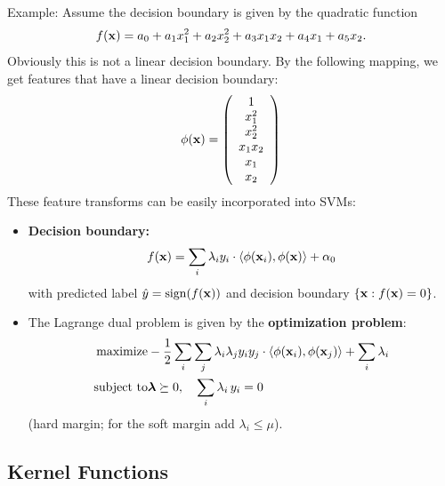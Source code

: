     Example: Assume the decision boundary is given by the quadratic function
    \begin{displaymath}
      f(\bm{\mathrm{x}}) = a_0 + a_1 x_1^2 + a_2 x_2^2 + a_3 x_1 x_2 + a_4 x_1+a_5 x_2.
    \end{displaymath}
    Obviously this is not a linear decision boundary. By the following mapping, we get features that have a linear decision boundary:
    \begin{displaymath}
      \phi(\bm{\mathrm{x}}) = \left(\begin{array}{c}
                             1 \\ x_1^2 \\ x_2^2 \\ x_1x_2 \\ x_1 \\ x_2
                           \end{array}
                     \right)
    \end{displaymath}
  These feature transforms can be easily incorporated into SVMs:
  \begin{itemize}
    \item \textbf{Decision boundary:}
      {\small
        \begin{displaymath}
          f(\bm{\mathrm{x}}) = \sum_i \lambda_i y_i \cdot  \langle\phi(\bm{\mathrm{x}}_i), \phi(\bm{\mathrm{x}}) \rangle + \alpha_0  
        \end{displaymath}
      }
      with predicted label $\hat y=\operatorname{sign}(f(\bm{\mathrm{x}}))$ and decision boundary $\{\bm{\mathrm{x}}: f(\bm{\mathrm{x}})=0\}$.
    \item The Lagrange dual problem is given by the \textbf{optimization problem}:
      {\small
        \begin{eqnarray*}
          \mbox{maximize} & -\frac{1}{2} \sum_i \sum_j \lambda_i \lambda_j y_i y_j \cdot \langle\phi(\bm{\mathrm{x}}_i),\phi(\bm{\mathrm{x}}_j)\rangle + \sum_i \lambda_i \\   
          \mbox{subject to}  & \bm{\mathrm{\lambda}}\succeq 0, \quad \sum_{i} \lambda_i \, y_i = 0
        \end{eqnarray*}
      }
      (hard margin; for the soft margin add $\lambda_i\le\mu$).
  \end{itemize}
 
\subsection{Kernel Functions}

